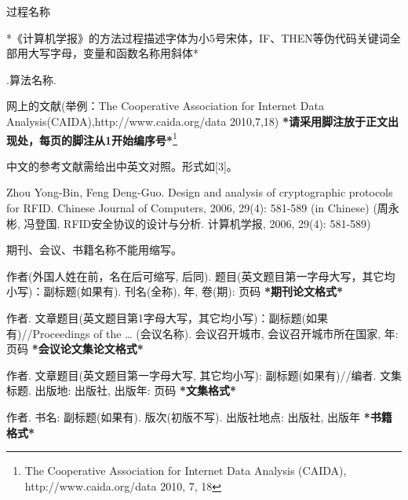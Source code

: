 \documentclass[10.5pt,compsoc]{CjC}
\theoremstyle{mystyle}
\begin{document}
{\quad 过程名称

{*《计算机学报》的方法过程描述字体为小5号宋体，IF、THEN等伪代码关键词全部用大写字母，变量和函数名称用斜体*}


.\quad 算法名称.

\vspace {3mm}


\vspace {5mm}
\centerline
{
}

\begin{thebibliography}{99}

   \addtolength{\itemsep}{-1em}
  \vspace {1.5mm}

  网上的文献(举例：The Cooperative
  Association for Internet Data Analysis(CAIDA),http://www.caida.org/data
  2010,7,18) \textbf{*请采用脚注放于正文出现处，每页的脚注从1开始编序号*}\footnote{The Cooperative Association for Internet Data
  Analysis (CAIDA), http://www.caida.org/data 2010, 7, 18}

   中文的参考文献需给出中英文对照。形式如[3]。

   Zhou Yong-Bin, Feng Deng-Guo. Design and analysis of cryptographic
  protocols for RFID. Chinese Journal of Computers, 2006, 29(4): 581-589 (in
  Chinese) \newline
  (周永彬, 冯登国. RFID安全协议的设计与分析. 计算机学报, 2006, 29(4): 581-589)

   期刊、会议、书籍名称不能用缩写。

   作者(外国人姓在前，名在后可缩写, 后同).
  题目(英文题目第一字母大写，其它均小写)：副标题(如果有). 刊名(全称), 年,
  卷(期): 页码 \textbf{*期刊论文格式*}

  作者.
  文章题目(英文题目第1字母大写，其它均小写)：副标题(如果有)//Proceedings of
  the {\ldots} (会议名称). 会议召开城市, 会议召开城市所在国家, 年: 页码
  \textbf{*会议论文集论文格式*}

  作者. 文章题目(英文题目第一字母大写, 其它均小写):
  副标题(如果有)//编者. 文集标题. 出版地: 出版社, 出版年: 页码
  \textbf{*文集格式*}

  作者. 书名: 副标题(如果有). 版次(初版不写). 出版社地点: 出版社,
  出版年 \textbf{*书籍格式*}


\end{thebibliography}}
\end{document}
